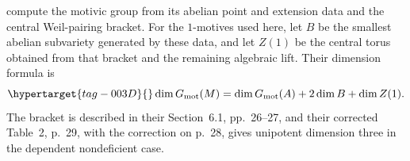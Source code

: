 \begin{remark}
\hypertarget{tag-IA11}{}\label{I:motivic-dimension-input}
\citet[Construction~3.4, p.~12, and Lemma~3.5, p.~13, arXiv v2]{bertolin2022} compute the motivic
group from its abelian point and extension data and the central
Weil-pairing bracket. For the $1$-motives used here, let $B$ be the
smallest abelian subvariety generated by these data, and let $Z(1)$
be the central torus obtained from that bracket and the remaining
algebraic lift. Their dimension formula is
\begin{equation}\hypertarget{tag-003D}{}\label{ari:eq:cp-MTdim}
 \dim G_{\mathrm{mot}}(M)
 =\dim G_{\mathrm{mot}}(A)+2\dim B+\dim Z(1).
\end{equation}
The bracket is described in their Section~6.1, pp.~26--27, and
their corrected Table~2, p.~29, with the correction on p.~28, gives unipotent dimension
three in the dependent nondeficient case.
\end{remark}